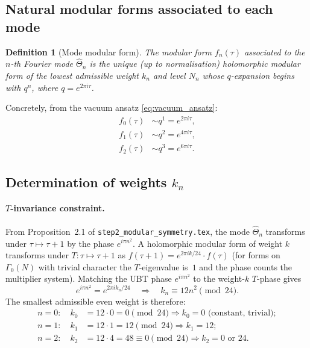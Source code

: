 \documentclass[12pt,a4paper]{article}
\newtheorem{definition}[theorem]{Definition}
\theoremstyle{remark}
\begin{document}
\subsection{Natural modular forms associated to each mode}

\begin{definition}[Mode modular form]
\label{def:mode_form}
The modular form $f_n(\tau)$ associated to the $n$-th Fourier mode
$\hat\Theta_n$ is the unique (up to normalisation) holomorphic modular form
of the lowest admissible weight $k_n$ and level $N_n$ whose $q$-expansion
begins with $q^n$, where $q = e^{2\pi i\tau}$.
\end{definition}

Concretely, from the vacuum ansatz \eqref{eq:vacuum_ansatz}:
\begin{align}
  f_0(\tau) &\sim q^1 = e^{2\pi i\tau}, \label{eq:f0}\\
  f_1(\tau) &\sim q^2 = e^{4\pi i\tau}, \label{eq:f1}\\
  f_2(\tau) &\sim q^3 = e^{6\pi i\tau}. \label{eq:f2}
\end{align}

\subsection{Determination of weights $k_n$}

\paragraph{$T$-invariance constraint.}
From Proposition~2.1 of \texttt{step2\_modular\_symmetry.tex}, the mode
$\hat\Theta_n$ transforms under $\tau\mapsto\tau+1$ by the phase
$e^{i\pi n^2}$.  A holomorphic modular form of weight $k$ transforms
under $T:\tau\mapsto\tau+1$ as $f(\tau+1) = e^{2\pi i k/24}\cdot f(\tau)$
(for forms on $\Gamma_0(N)$ with trivial character the $T$-eigenvalue is~$1$
and the phase counts the multiplier system).
Matching the UBT phase $e^{i\pi n^2}$ to the weight-$k$ $T$-phase gives
\begin{equation}
  \label{eq:weight_condition}
  e^{i\pi n^2} = e^{2\pi i k_n/24}
  \quad\Longrightarrow\quad
  k_n \equiv 12 n^2 \pmod{24}.
\end{equation}
The smallest admissible even weight is therefore:
\begin{align}
  n=0\colon\quad k_0 &= 12 \cdot 0 = 0 \pmod{24} \Rightarrow k_0 = 0
    \text{ (constant, trivial)}; \label{eq:k0}\\
  n=1\colon\quad k_1 &= 12 \cdot 1 = 12 \pmod{24} \Rightarrow k_1 = 12; \label{eq:k1}\\
  n=2\colon\quad k_2 &= 12 \cdot 4 = 48 \equiv 0 \pmod{24} \Rightarrow k_2 = 0
    \text{ or } 24. \label{eq:k2}
\end{align}
\end{document}
